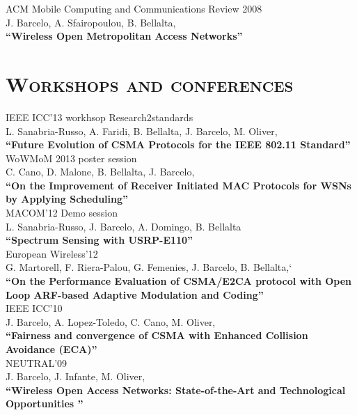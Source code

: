 \documentclass[line,margin]{res}
\begin{document}
\begin{resume}
\hfill {ACM Mobile Computing and Communications Review 2008} \\
J. Barcelo, A. Sfairopoulou, B. Bellalta,\\
\textbf{``Wireless Open Metropolitan Access Networks''}\\

\section{\textsc{Workshops and conferences}}

\hfill {IEEE ICC'13 workhsop Research2standards} \\
L. Sanabria-Russo, A. Faridi, B. Bellalta, J. Barcelo, M. Oliver,\\
\textbf{``Future Evolution of CSMA Protocols for the IEEE 802.11 Standard''}\\

\hfill {WoWMoM 2013 poster session} \\
C. Cano, D. Malone, B. Bellalta, J. Barcelo,\\
\textbf{``On the Improvement of Receiver Initiated MAC Protocols for WSNs by Applying Scheduling''}\\

\hfill {MACOM'12 Demo session} \\
L. Sanabria-Russo, J. Barcelo, A. Domingo, B. Bellalta\\
\textbf{``Spectrum Sensing with USRP-E110''}\\

\hfill {European Wireless'12} \\
G. Martorell, F. Riera-Palou, G. Femenies, J. Barcelo, B. Bellalta,`\\
\textbf{``On the Performance Evaluation of CSMA/E2CA protocol with Open Loop ARF-based Adaptive Modulation and Coding''}\\

\hfill {IEEE ICC'10} \\
J. Barcelo, A. Lopez-Toledo,  C. Cano, M. Oliver,\\
\textbf{``Fairness and convergence of CSMA with Enhanced Collision Avoidance (ECA)''}\\

\hfill {NEUTRAL'09} \\
J. Barcelo,  J. Infante, M. Oliver,\\
\textbf{``Wireless Open Access Networks: State-of-the-Art and Technological Opportunities ''}\\


\end{resume}
\end{document}
